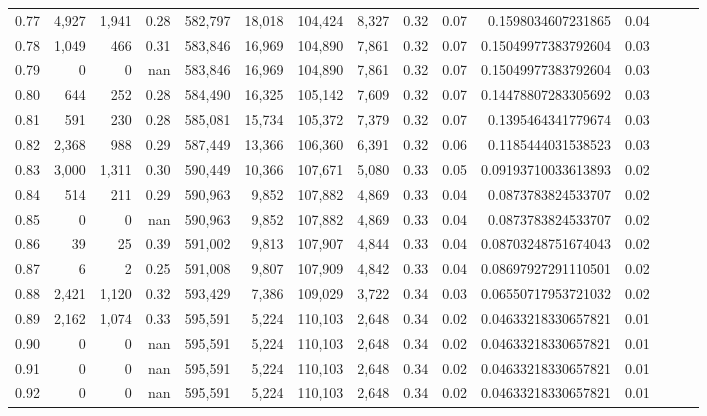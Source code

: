 \begin{tabular}{rrrrrrrrrrrrrrr}
0.77 &   4,927 &   1,941 &  0.28 &  582,797 &   18,018 &  104,424 &    8,327 &  0.32 &  0.07 &    0.1598034607231865 &      0.04 \\
0.78 &   1,049 &     466 &  0.31 &  583,846 &   16,969 &  104,890 &    7,861 &  0.32 &  0.07 &   0.15049977383792604 &      0.03 \\
0.79 &       0 &       0 &   nan &  583,846 &   16,969 &  104,890 &    7,861 &  0.32 &  0.07 &   0.15049977383792604 &      0.03 \\
0.80 &     644 &     252 &  0.28 &  584,490 &   16,325 &  105,142 &    7,609 &  0.32 &  0.07 &   0.14478807283305692 &      0.03 \\
0.81 &     591 &     230 &  0.28 &  585,081 &   15,734 &  105,372 &    7,379 &  0.32 &  0.07 &    0.1395464341779674 &      0.03 \\
0.82 &   2,368 &     988 &  0.29 &  587,449 &   13,366 &  106,360 &    6,391 &  0.32 &  0.06 &    0.1185444031538523 &      0.03 \\
0.83 &   3,000 &   1,311 &  0.30 &  590,449 &   10,366 &  107,671 &    5,080 &  0.33 &  0.05 &   0.09193710033613893 &      0.02 \\
0.84 &     514 &     211 &  0.29 &  590,963 &    9,852 &  107,882 &    4,869 &  0.33 &  0.04 &    0.0873783824533707 &      0.02 \\
0.85 &       0 &       0 &   nan &  590,963 &    9,852 &  107,882 &    4,869 &  0.33 &  0.04 &    0.0873783824533707 &      0.02 \\
0.86 &      39 &      25 &  0.39 &  591,002 &    9,813 &  107,907 &    4,844 &  0.33 &  0.04 &   0.08703248751674043 &      0.02 \\
0.87 &       6 &       2 &  0.25 &  591,008 &    9,807 &  107,909 &    4,842 &  0.33 &  0.04 &   0.08697927291110501 &      0.02 \\
0.88 &   2,421 &   1,120 &  0.32 &  593,429 &    7,386 &  109,029 &    3,722 &  0.34 &  0.03 &   0.06550717953721032 &      0.02 \\
0.89 &   2,162 &   1,074 &  0.33 &  595,591 &    5,224 &  110,103 &    2,648 &  0.34 &  0.02 &   0.04633218330657821 &      0.01 \\
0.90 &       0 &       0 &   nan &  595,591 &    5,224 &  110,103 &    2,648 &  0.34 &  0.02 &   0.04633218330657821 &      0.01 \\
0.91 &       0 &       0 &   nan &  595,591 &    5,224 &  110,103 &    2,648 &  0.34 &  0.02 &   0.04633218330657821 &      0.01 \\
0.92 &       0 &       0 &   nan &  595,591 &    5,224 &  110,103 &    2,648 &  0.34 &  0.02 &   0.04633218330657821 &      0.01 \\

\end{tabular}
